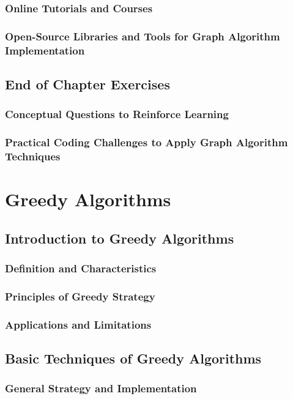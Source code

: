 \documentclass[12pt]{book} %
\begin{document}
\subsection{Online Tutorials and Courses}
\subsection{Open-Source Libraries and Tools for Graph Algorithm Implementation}

\section{End of Chapter Exercises}
\subsection{Conceptual Questions to Reinforce Learning}
\subsection{Practical Coding Challenges to Apply Graph Algorithm Techniques}

\chapter{Greedy Algorithms}

\section{Introduction to Greedy Algorithms}
\subsection{Definition and Characteristics}
\subsection{Principles of Greedy Strategy}
\subsection{Applications and Limitations}

\section{Basic Techniques of Greedy Algorithms}
\subsection{General Strategy and Implementation}
\end{document}
